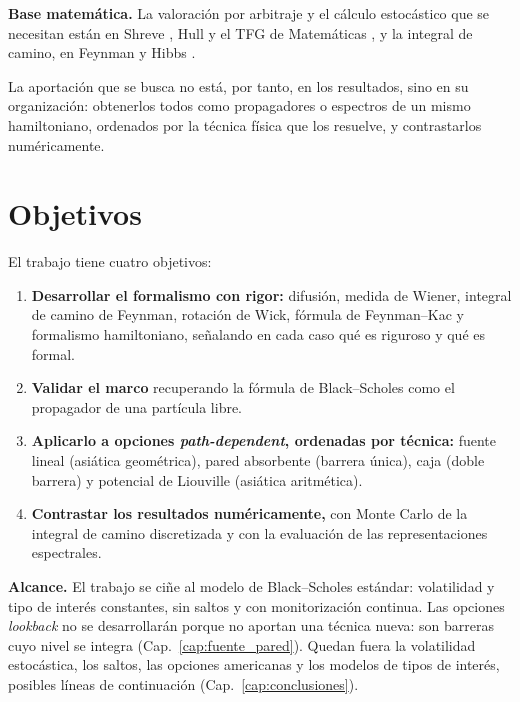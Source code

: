 \medskip

\noindent\textbf{Base matemática.}
La valoración por arbitraje y el cálculo estocástico que se necesitan
están en Shreve \cite{shreve}, Hull \cite{hull} y el TFG de Matemáticas
\cite{tfgm}, y la integral de camino, en Feynman y Hibbs
\cite{feynman-hibbs}.

\medskip

La aportación que se busca no está, por tanto, en los resultados, sino
en su organización: obtenerlos todos como propagadores o espectros de un
mismo hamiltoniano, ordenados por la técnica física que los resuelve, y
contrastarlos numéricamente.

\section{Objetivos}
\label{sec:objetivos}

El trabajo tiene cuatro objetivos:
\begin{enumerate}[leftmargin=*, label=\arabic*., itemsep=1pt, topsep=3pt]
 \item \textbf{Desarrollar el formalismo con rigor:} difusión, medida de
 Wiener, integral de camino de Feynman, rotación de Wick, fórmula de
 Feynman--Kac y formalismo hamiltoniano, señalando en cada caso qué es
 riguroso y qué es formal.
 \item \textbf{Validar el marco} recuperando la fórmula de
 Black--Scholes como el propagador de una partícula libre.
 \item \textbf{Aplicarlo a opciones \emph{path-dependent}, ordenadas por
 técnica:} fuente lineal (asiática geométrica), pared absorbente
 (barrera única), caja (doble barrera) y potencial de Liouville
 (asiática aritmética).
 \item \textbf{Contrastar los resultados numéricamente,} con Monte Carlo
 de la integral de camino discretizada y con la evaluación de las
 representaciones espectrales.
\end{enumerate}

\noindent\textbf{Alcance.}
El trabajo se ciñe al modelo de Black--Scholes estándar: volatilidad y
tipo de interés constantes, sin saltos y con monitorización continua.
Las opciones \emph{lookback} no se desarrollarán porque no aportan una
técnica nueva: son barreras cuyo nivel se integra
(Cap.~\ref{cap:fuente_pared}\enprep). Quedan fuera la volatilidad
estocástica, los saltos, las opciones americanas y los modelos de tipos
de interés, posibles líneas de continuación
(Cap.~\ref{cap:conclusiones}\enprep).

